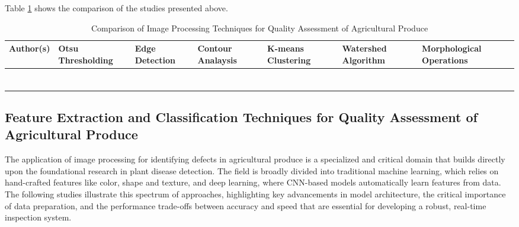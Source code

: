 {Table \ref{tab:relatedstudies_two} shows the comparison of the studies presented above.

\begin{table}
	\centering
	\caption{Comparison of Image Processing Techniques for Quality Assessment of Agricultural Produce}
	\label{tab:relatedstudies_two}
	\begin{tabular}{
			>{\centering\arraybackslash}m{3cm} 
			>{\centering\arraybackslash}m{2.5cm}   
			>{\centering\arraybackslash}m{2cm} 
			>{\centering\arraybackslash}m{2cm}    
			>{\centering\arraybackslash}m{2cm}  
			>{\centering\arraybackslash}m{2cm}  
			>{\centering\arraybackslash}m{2.5cm}
		}
		\toprule
		\textbf{Author(s)} & \textbf{Otsu Thresholding} & \textbf{Edge Detection} & \textbf{Contour Analaysis} & \textbf{K-means Clustering} & \textbf{Watershed Algorithm} & \textbf{Morphological Operations} \\
		\midrule
		
		\citet{amna2023machine} &
		&
		&
		\checkmark	&
		&
		&
		\checkmark \\
		
		\citet{Doan2023} &
		\checkmark &
		\checkmark &
		\checkmark &
		&
		&
		\\
		
		\citet{Narendra2021} &
		&
		&
		&
		\checkmark &
		\checkmark &
		\\
		
		\citet{Kazi2023} &
		&
		&
		&
		\checkmark &
		&
		\\
		
		\citet{Luo2024} &
		\checkmark &
		\checkmark &
		&
		&
		&
		\checkmark \\
		
		\citet{Alqethami2022} &
		&
		&
		&
		\checkmark &
		&
		\\
		
		\citet{Javidan2023} &
		&
		\checkmark &
		&
		\checkmark &
		&
		\\
		
		\bottomrule
	\end{tabular}
\end{table}

\newpage

\subsection{Feature Extraction and Classification  Techniques for Quality Assessment of Agricultural Produce}
The application of image processing for identifying defects in agricultural produce is a specialized and critical domain that builds directly upon the foundational research in plant disease detection. The field is broadly divided into traditional machine learning, which relies on hand-crafted features like color, shape and texture, and deep learning, where CNN-based models automatically learn features from data. The following studies illustrate this spectrum of approaches, highlighting key advancements in model architecture, the critical importance of data preparation, and the performance trade-offs between accuracy and speed that are essential for developing a robust, real-time inspection system.

}
